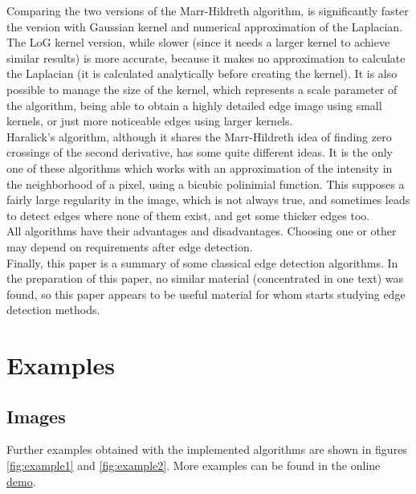 \documentclass{ipol}
\numberwithin{equation}{section}
\numberwithin{table}{section}
\numberwithin{figure}{section}
\begin{document}
Comparing the two versions of the Marr-Hildreth algorithm, is significantly faster the version with Gaussian kernel and numerical approximation of the Laplacian. The LoG kernel version, while slower (since it needs a larger kernel to achieve similar results) is more accurate, because it makes no approximation to calculate the Laplacian (it is calculated analytically before creating the kernel). It is also possible to manage the size of the kernel, which represents a scale parameter of the algorithm, being able to obtain a highly detailed edge image using small kernels, or just more noticeable edges using larger kernels. \\

Haralick's algorithm, although it shares the Marr-Hildreth idea of finding zero crossings of the second derivative, has some quite different ideas. It is the only one of these algorithms which works with an approximation of the intensity in the neighborhood of a pixel, using a bicubic polinimial function. This supposes a fairly large regularity in the image, which is not always true, and sometimes leads to detect edges where none of them exist, and get some thicker edges too. \\

All algorithms have their advantages and disadvantages. Choosing one or other may depend on requirements after edge detection. \\ 

Finally, this paper is a summary of some classical edge detection algorithms. In the preparation of this paper, no similar material (concentrated in one text) was found, so this paper appears to be useful material for whom starts studying edge detection methods. \\

\clearpage
\section{Examples}
\label{sec:examples}

\subsection{Images}

Further examples obtained with the implemented algorithms are shown in figures \ref{fig:example1} and \ref{fig:example2}. More examples can be found in the online \href{http://link_to_demo}{demo}. \\
\end{document}
